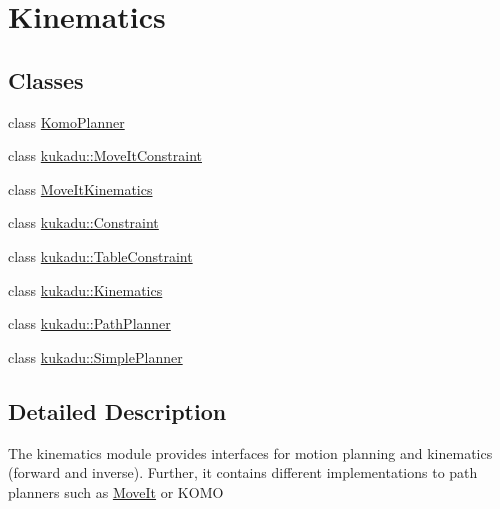 \hypertarget{group__Kinematics}{}\section{Kinematics}
\label{group__Kinematics}
\subsection*{Classes}
\begin{DoxyCompactItemize}
\item 
class \hyperlink{classKomoPlanner}{Komo\+Planner}
\item 
class \hyperlink{classkukadu_1_1MoveItConstraint}{kukadu\+::\+Move\+It\+Constraint}
\item 
class \hyperlink{classMoveItKinematics}{Move\+It\+Kinematics}
\item 
class \hyperlink{classkukadu_1_1Constraint}{kukadu\+::\+Constraint}
\item 
class \hyperlink{classkukadu_1_1TableConstraint}{kukadu\+::\+Table\+Constraint}
\item 
class \hyperlink{classkukadu_1_1Kinematics}{kukadu\+::\+Kinematics}
\item 
class \hyperlink{classkukadu_1_1PathPlanner}{kukadu\+::\+Path\+Planner}
\item 
class \hyperlink{classkukadu_1_1SimplePlanner}{kukadu\+::\+Simple\+Planner}
\end{DoxyCompactItemize}


\subsection{Detailed Description}
The kinematics module provides interfaces for motion planning and kinematics (forward and inverse). Further, it contains different implementations to path planners such as \hyperlink{classkukadu_1_1MoveIt}{Move\+It} or K\+O\+MO 